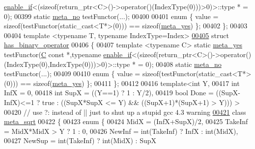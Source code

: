 \begin{DoxyCode}
      \hyperlink{struct_eigen_1_1internal_1_1enable__if}{enable\_if}<(\textcolor{keyword}{sizeof}(return\_ptr<C>()->\textcolor{keyword}{operator}()(IndexType(0)))>0)>::type * = 0);
00399   \textcolor{keyword}{static} \hyperlink{struct_eigen_1_1internal_1_1meta__no}{meta\_no} testFunctor(...);
00400 
00401   \textcolor{keyword}{enum} \{ value = \textcolor{keyword}{sizeof}(testFunctor(static\_cast<T*>(0))) == \textcolor{keyword}{sizeof}(\hyperlink{struct_eigen_1_1internal_1_1meta__yes}{meta\_yes}) \};
00402 \};
00403 
00404 \textcolor{keyword}{template} <\textcolor{keyword}{typename} T, \textcolor{keyword}{typename} IndexType=Index>
\hyperlink{struct_eigen_1_1internal_1_1has__binary__operator}{00405} \textcolor{keyword}{struct }\hyperlink{struct_eigen_1_1internal_1_1has__binary__operator}{has\_binary\_operator}
00406 \{
00407   \textcolor{keyword}{template} <\textcolor{keyword}{typename} C> \textcolor{keyword}{static} \hyperlink{struct_eigen_1_1internal_1_1meta__yes}{meta\_yes} testFunctor(\hyperlink{group___core___module}{C} \textcolor{keyword}{const} *,\textcolor{keyword}{typename} 
      \hyperlink{struct_eigen_1_1internal_1_1enable__if}{enable\_if}<(\textcolor{keyword}{sizeof}(return\_ptr<C>()->\textcolor{keyword}{operator}()(IndexType(0),IndexType(0)))>0)>::type * = 0);
00408   \textcolor{keyword}{static} \hyperlink{struct_eigen_1_1internal_1_1meta__no}{meta\_no} testFunctor(...);
00409 
00410   \textcolor{keyword}{enum} \{ value = \textcolor{keyword}{sizeof}(testFunctor(static\_cast<T*>(0))) == \textcolor{keyword}{sizeof}(\hyperlink{struct_eigen_1_1internal_1_1meta__yes}{meta\_yes}) \};
00411 \};
00412 
00416 \textcolor{keyword}{template}<\textcolor{keywordtype}{int} Y,
00417          \textcolor{keywordtype}{int} InfX = 0,
00418          \textcolor{keywordtype}{int} SupX = ((Y==1) ? 1 : Y/2),
00419          \textcolor{keywordtype}{bool} Done = ((SupX-InfX)<=1 ? \textcolor{keyword}{true} : ((SupX*SupX <= Y) && ((SupX+1)*(SupX+1) > Y))) >
00420                                 \textcolor{comment}{// use ?: instead of || just to shut up a stupid gcc 4.3 warning}
\hyperlink{class_eigen_1_1internal_1_1meta__sqrt}{00421} \textcolor{keyword}{class} \hyperlink{class_eigen_1_1internal_1_1meta__sqrt}{meta\_sqrt}
00422 \{
00423     \textcolor{keyword}{enum} \{
00424       MidX = (InfX+SupX)/2,
00425       TakeInf = MidX*MidX > Y ? 1 : 0,
00426       NewInf = \textcolor{keywordtype}{int}(TakeInf) ? InfX : int(MidX),
00427       NewSup = int(TakeInf) ? int(MidX) : SupX

\end{DoxyCode}
